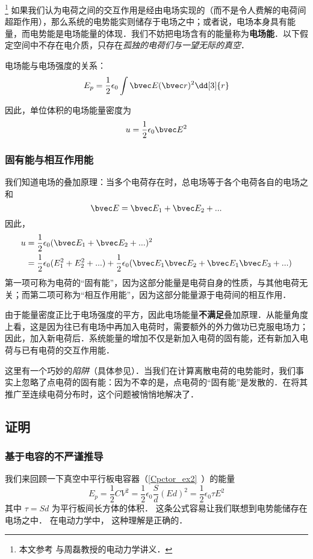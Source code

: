 
\footnote{本文参考 \cite{GriffE} 与周磊教授的电动力学讲义．}
如果我们认为电荷之间的交互作用是经由电场实现的（而不是令人费解的电荷间超距作用），那么系统的电势能实则储存于电场之中；或者说，电场本身具有能量，而电势能是电场能量的体现．我们不妨把电场含有的能量称为\textbf{电场能}．以下假定空间中不存在电介质，只存在\textsl{孤独的电荷们与一望无际的真空}．

电场能与电场强度的关系：
\begin{equation}\label{EEng_eq2}
E_p = \frac12 \epsilon_0 \int \bvec E(\bvec r)^2 \dd[3]{r}
\end{equation}

因此，单位体积的电场能量密度为
\begin{equation}
u = \frac12 \epsilon_0 \bvec E^2
\end{equation}

\subsubsection{固有能与相互作用能}
我们知道电场的叠加原理：当多个电荷存在时，总电场等于各个电荷各自的电场之和
$$
\bvec E = \bvec E_1 + \bvec E_2 +... 
$$
因此，
$$
\begin{aligned}
u &= \frac12 \epsilon_0 (\bvec E_1 + \bvec E_2 +... )^2\\
&=\frac12 \epsilon_0(E_1^2+E_2^2+...)+\frac12 \epsilon_0 (\bvec E_1 \bvec E_2+\bvec E_1 \bvec E_3+...)
\end{aligned}
$$
第一项可称为电荷的“固有能”，因为这部分能量是电荷自身的性质，与其他电荷无关；而第二项可称为“相互作用能”，因为这部分能量源于电荷间的相互作用．

由于能量密度正比于电场强度的平方，因此电场能量\textbf{不满足}叠加原理．从能量角度上看，这是因为往已有电场中再加入电荷时，需要额外的外力做功已克服电场力；因此，加入新电荷后．系统能量的增加不仅是新加入电荷的固有能，还有新加入电荷与已有电荷的交互作用能．

这里有一个巧妙的\textsl{陷阱}（具体参见\cite{GriffE}）．当我们在计算离散电荷的电势能时，我们事实上忽略了点电荷的固有能：因为不幸的是，点电荷的“固有能”是发散的．在将其推广至连续电荷分布时，这个问题被悄悄地解决了．

\subsection{证明}

\subsubsection{基于电容的不严谨推导}
我们来回顾一下真空中平行板电容器（\autoref{Cpctor_ex2}~）的能量
\begin{equation}
E_p = \frac12 CV^2 = \frac12 \epsilon_0 \frac Sd (Ed)^2 = \frac 12 \epsilon_0 \tau E^2
\end{equation}
其中 $\tau = Sd$ 为平行板间长方体的体积． 这条公式容易让我们联想到电势能储存在电场之中． 在电动力学中， 这种理解是正确的．

